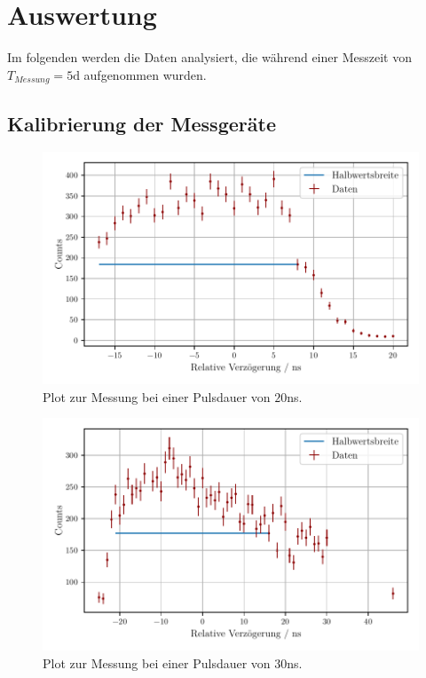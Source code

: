 \section{Auswertung}
\label{sec:Auswertung}

Im folgenden werden die Daten analysiert, die während einer Messzeit von $T_{Messung} = 5  \unit\day$ aufgenommen wurden.

\subsection{Kalibrierung der Messgeräte}





\begin{figure}
    \centering
    \includegraphics[width = 0.7 \linewidth]{build/20ns_plot.pdf}
    \caption{Plot zur Messung bei einer Pulsdauer von $20$ns.}
    \label{fig:20ns_plot}
\end{figure}


\begin{figure}
    \centering
    \includegraphics[width = 0.7 \linewidth]{build/30ns_plot.pdf}
    \caption{Plot zur Messung bei einer Pulsdauer von $30$ns.}
    \label{fig:30ns_plot}
\end{figure}